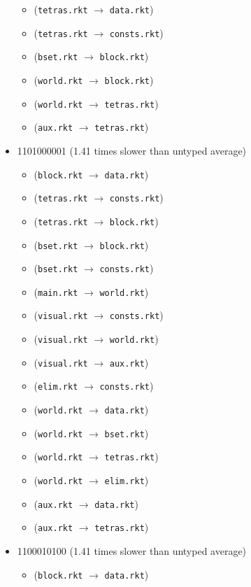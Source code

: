 \documentclass{article}
\newcommand{\mono}[1]{\texttt{#1}}
\begin{document}
\begin{itemize}
\begin{itemize}
  \item (\mono{tetras.rkt} $\rightarrow$ \mono{data.rkt})
  \item (\mono{tetras.rkt} $\rightarrow$ \mono{consts.rkt})
  \item (\mono{bset.rkt} $\rightarrow$ \mono{block.rkt})
  \item (\mono{world.rkt} $\rightarrow$ \mono{block.rkt})
  \item (\mono{world.rkt} $\rightarrow$ \mono{tetras.rkt})
  \item (\mono{aux.rkt} $\rightarrow$ \mono{tetras.rkt})
  \end{itemize}
\item 1101000001 (1.41 times slower than untyped average)
  \begin{itemize}
  \item (\mono{block.rkt} $\rightarrow$ \mono{data.rkt})
  \item (\mono{tetras.rkt} $\rightarrow$ \mono{consts.rkt})
  \item (\mono{tetras.rkt} $\rightarrow$ \mono{block.rkt})
  \item (\mono{bset.rkt} $\rightarrow$ \mono{block.rkt})
  \item (\mono{bset.rkt} $\rightarrow$ \mono{consts.rkt})
  \item (\mono{main.rkt} $\rightarrow$ \mono{world.rkt})
  \item (\mono{visual.rkt} $\rightarrow$ \mono{consts.rkt})
  \item (\mono{visual.rkt} $\rightarrow$ \mono{world.rkt})
  \item (\mono{visual.rkt} $\rightarrow$ \mono{aux.rkt})
  \item (\mono{elim.rkt} $\rightarrow$ \mono{consts.rkt})
  \item (\mono{world.rkt} $\rightarrow$ \mono{data.rkt})
  \item (\mono{world.rkt} $\rightarrow$ \mono{bset.rkt})
  \item (\mono{world.rkt} $\rightarrow$ \mono{tetras.rkt})
  \item (\mono{world.rkt} $\rightarrow$ \mono{elim.rkt})
  \item (\mono{aux.rkt} $\rightarrow$ \mono{data.rkt})
  \item (\mono{aux.rkt} $\rightarrow$ \mono{tetras.rkt})
  \end{itemize}
\item 1100010100 (1.41 times slower than untyped average)
  \begin{itemize}
  \item (\mono{block.rkt} $\rightarrow$ \mono{data.rkt})

\end{itemize}
\end{itemize}
\end{document}
